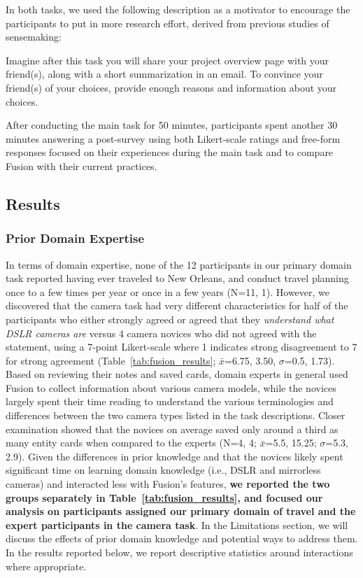 In both tasks, we used the following description as a motivator to encourage the participants to put in more research effort, derived from previous studies of sensemaking:

\begin{tightquote}
Imagine after this task you will share your project overview page with your friend(s), along with a short summarization in an email. To convince your friend(s) of your choices, provide enough reasons and information about your choices.
\end{tightquote}

\noindent After conducting the main task for 50 minutes, participants spent another 30 minutes answering a post-survey using both Likert-scale ratings and free-form responses focused on their experiences during the main task and to compare Fusion with their current practices.


\subsection{Results}



\subsubsection{Prior Domain Expertise}
In terms of domain expertise, none of the 12 participants in our primary domain task reported having ever traveled to New Orleans, and conduct travel planning once to a few times per year or once in a few years (N=11, 1). However, we discovered that the camera task had very different characteristics for half of the participants who either strongly agreed or agreed that they \emph{understand what DSLR cameras are} versus 4 camera novices who did not agreed with the statement, using a 7-point Likert-scale where 1 indicates strong disagreement to 7 for strong agreement (Table~\ref{tab:fusion_results}; $\bar{x}$=6.75, 3.50, $\sigma$=0.5, 1.73).
Based on reviewing their notes and saved cards, domain experts in general used Fusion to collect information about various camera models, while the novices largely spent their time reading to understand the various terminologies and differences between the two camera types listed in the task descriptions.
Closer examination showed that the novices on average saved only around a third as many entity cards when compared to the experts (N=4, 4; $\bar{x}$=5.5, 15.25; $\sigma$=5.3, 2.9).
Given the differences in prior knowledge and that the novices likely spent significant time on learning domain knowledge (i.e., DSLR and mirrorless cameras) and interacted less with Fusion's features, \textbf{we reported the two groups separately in Table~\ref{tab:fusion_results}, and focused our analysis on participants assigned our primary domain of travel and the expert participants in the camera task}. In the Limitations section, we will discuss the effects of prior domain knowledge and potential ways to address them. 
In the results reported below, we report descriptive statistics around interactions where appropriate. 

